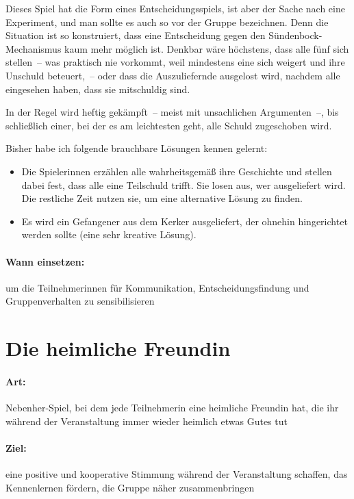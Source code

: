 Dieses Spiel hat die Form eines Entscheidungsspiels, ist aber der Sache nach eine Experiment, und man sollte es auch so vor der Gruppe bezeichnen. Denn die Situation ist so konstruiert, dass eine Entscheidung gegen den Sündenbock-Mechanismus kaum mehr möglich ist. Denkbar wäre höchstens, dass alle fünf sich stellen~-- was praktisch nie vorkommt, weil mindestens eine sich weigert und ihre Unschuld beteuert,~-- oder dass die Auszuliefernde ausgelost wird, nachdem alle eingesehen haben, dass sie mitschuldig sind.

In der Regel wird heftig gekämpft~-- meist mit unsachlichen Argumenten~--, bis schließlich einer, bei der es am leichtesten geht, alle Schuld zugeschoben wird.

Bisher habe ich folgende brauchbare Lösungen kennen gelernt:
\begin{itemize}
	\item Die Spielerinnen erzählen alle wahrheitsgemäß ihre Geschichte und stellen dabei fest, dass alle eine Teilschuld trifft. Sie losen aus, wer ausgeliefert wird. Die restliche Zeit nutzen sie, um eine alternative Lösung zu finden.
	\item Es wird ein Gefangener aus dem Kerker ausgeliefert, der ohnehin hingerichtet werden sollte (eine sehr kreative Lösung).
\end{itemize}

\paragraph{Wann einsetzen:} um die Teilnehmerinnen für Kommunikation, Entscheidungsfindung und Gruppenverhalten zu sensibilisieren

\section{Die heimliche Freundin}
\paragraph{Art:} Nebenher-Spiel, bei dem jede Teilnehmerin eine heimliche Freundin hat, die ihr während der Veranstaltung immer wieder heimlich etwas Gutes tut
\paragraph{Ziel:} eine positive und kooperative Stimmung während der Veranstaltung schaffen, das Kennenlernen fördern, die Gruppe näher zusammenbringen
